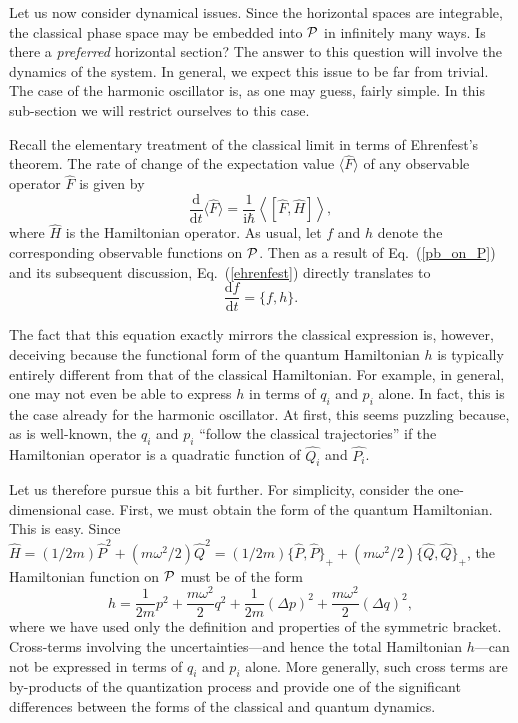 \documentclass[12pt,aps,eqsecnum,tighten]{revtex4-2}
\def\be{\begin{equation}}
\def\ee{\end{equation}}
\def\<{\langle}
\def\>{\rangle}
\def\d{{\mathrm d}}
\def\i{\mathrm{i}}
\def\P{{\cal P}}
\def\w{\omega}
\newcommand{\eqn}[1]{Eq.~(\ref{#1})}
\begin{document}
Let us now consider dynamical issues.  Since the horizontal spaces are
integrable, the classical phase space may be embedded into $\P$ in
infinitely many ways.  Is there a {\em preferred} horizontal section?
The answer to this question will involve the dynamics of the system.
In general, we expect this issue to be far from trivial.  The case of
the harmonic oscillator is, as one may guess, fairly simple. In this
sub-section we will restrict ourselves to this case. 

Recall the elementary treatment of the classical limit in terms of
Ehrenfest's theorem.  The rate of change of the expectation value
$\< \hat{F} \>$ of any observable operator $\hat{F}$ is given by
%
\be \label{ehrenfest}
\frac{\d}{\d t} \< \hat{F} \> = \frac{1}{\i\hbar} 
\left<\left[ \hat{F}, \hat{H} \right] \right>,
\ee
%
where $\hat{H}$ is the Hamiltonian operator.  As usual, let $f$ and
$h$ denote the corresponding observable functions on $\P$.  Then as a
result of \eqn{pb_on_P} and its subsequent discussion, \eqn{ehrenfest}
directly translates to
%
\be
	\frac{\d f}{\d t} = \{ f, h \}.
\ee
%

The fact that this equation exactly mirrors the classical expression
is, however, deceiving because the functional form of the quantum
Hamiltonian $h$ is typically entirely different from that of the
classical Hamiltonian.  For example, in general, one may not even be
able to express $h$ in terms of $q_i$ and $p_i$ alone. In fact, this
is the case already for the harmonic oscillator. At first, this seems
puzzling because, as is well-known, the $q_i$ and $p_i$ ``follow the
classical trajectories'' if the Hamiltonian operator is a quadratic
function of $\hat{Q_i}$ and $\hat{P_i}$.

Let us therefore pursue this a bit further. For simplicity,
consider the one-dimensional case.  First, we must obtain the form of
the quantum Hamiltonian.  This is easy.  Since $ \hat{H} = (1 /
2m)\hat{P}^2 + (m\w^2 / 2)\hat{Q}^2 = (1 / 2m) \{ \hat{P}, \hat{P}
\}_+ + (m\w^2 / 2) \{ \hat{Q}, \hat{Q} \}_+$, the Hamiltonian function
on $\P$ must be of the form
%
\be h = \frac{1}{2m}p^2 + \frac{m\w^2}{2}q^2 +
\frac{1}{2m}(\Delta p)^2 + \frac{m\w^2}{2}(\Delta q)^2, \ee 
%
where we have used only the definition and properties of the symmetric
bracket.  Cross-terms involving the uncertainties---and hence the
total Hamiltonian $h$---can not be expressed in terms of $q_i$ and
$p_i$ alone. More generally, such cross terms are by-products of the
quantization process and provide one of the significant differences
between the forms of the classical and quantum dynamics.
\end{document}
